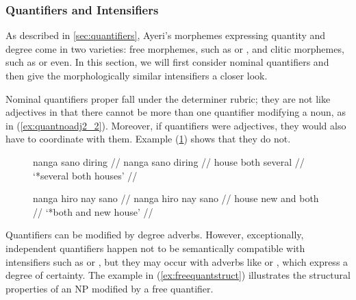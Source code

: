 
\subsubsection{Quantifiers and Intensifiers}
\label{subsubsec:quantsyn}

As described in \autoref{sec:quantifiers}, Ayeri's morphemes expressing
quantity and degree come in two varieties: free morphemes, such as
 or , and clitic
morphemes, such as  or 
{even}. In this section, we will first consider nominal quantifiers and then
give the morphologically similar intensifiers a closer look.

Nominal quantifiers proper fall under the determiner rubric; they are not like
adjectives in that there cannot be more than one quantifier modifying a noun, as
in (\ref{ex:quantnoadj2_2}). Moreover, if quantifiers were adjectives, they would
also have to coordinate with them. Example
(\ref{ex:quantnoadj2_3}) shows that they do not.

\begin{figure}
\pex\label{ex:quantnoadj2}
\a\label{ex:quantnoadj2_2}\ljudge*\begingl
	\gla nanga sano diring //
	\glb nanga sano diring //
	\glc house both several //
	\glft `*several both houses' //
\endgl

\a\label{ex:quantnoadj2_3}\ljudge*\begingl
	\gla nanga hiro nay sano //
	\glb nanga hiro nay sano //
	\glc house new and both //
	\glft `*both and new house' //
\endgl
\xe
\end{figure}

Quantifiers can be modified by degree adverbs. However, exceptionally,
independent quantifiers happen not to be semantically compatible with
intensifiers such as  or
, but they may occur with adverbs like
 or , which express a
degree of certainty. The example in (\ref{ex:freequantstruct}) illustrates the
structural properties of an NP modified by a free quantifier.

